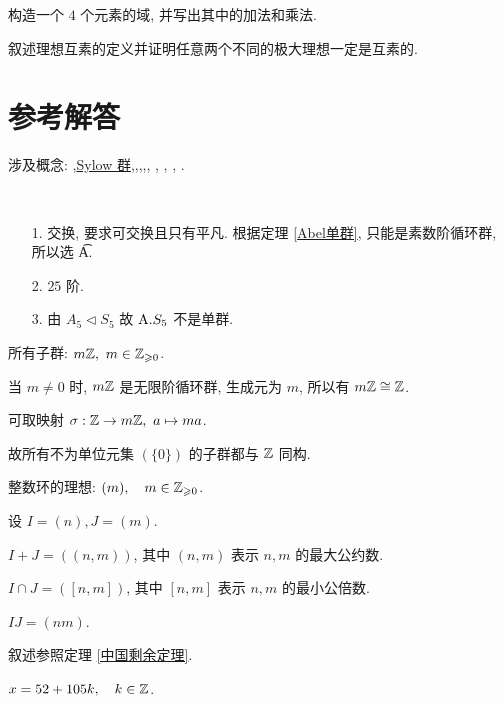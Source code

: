 \problem[题目 8] 构造一个 $4$ 个元素的域, 并写出其中的加法和乘法.

\problem[题目 9] 叙述理想互素的定义并证明任意两个不同的极大理想一定是互素的.

\newpage

\section*{参考解答}

涉及概念: ,\hyperref[Sylow1]{Sylow 群},,,,, , , , .

\problem[题目1]
\begin{solution}\

	\begin{itemize}
		\item[1.] 交换, 要求可交换且只有平凡. 根据定理 \ref{Abel单群}, 只能是素数阶循环群, 所以选 \t A.
		\item[2.] $25$ 阶.
		\item[3.] 由 $A_5\lhd S_5$ 故 $\text {A}. S_5$ 不是单群.
	\end{itemize}

\end{solution}

\problem[题目2]
\begin{solution}
	所有子群: $m\mathbb Z,\ m\in \mathbb Z_{\geqslant0}$.

	当 $m\neq 0$ 时, $m\mathbb Z$ 是无限阶循环群, 生成元为 $m$, 所以有 $m\mathbb Z\cong \mathbb Z$.

	可取映射 $\sigma:\mathbb Z\to m\mathbb Z,\ a\mapsto ma$.

	故所有不为单位元集 $(\{0\})$ 的子群都与 $\mathbb Z$ 同构.
\end{solution}

\problem[题目 3]
\begin{solution}
	整数环的理想: $(m),\quad m\in \mathbb Z_{\geqslant 0}$.

	设 $I=(n),J=(m)$.

	$I+J=((n,m))$, 其中 $(n,m)$ 表示 $n,m$ 的最大公约数.

	$I\cap J=([n,m])$, 其中 $[n,m]$ 表示 $n,m$ 的最小公倍数.

	$IJ=(nm)$.
\end{solution}

\problem[题目 5]

\begin{solution}
	叙述参照定理 \ref{中国剩余定理}.

	$x=52+105k,\quad k\in \mathbb Z$.
\end{solution}

